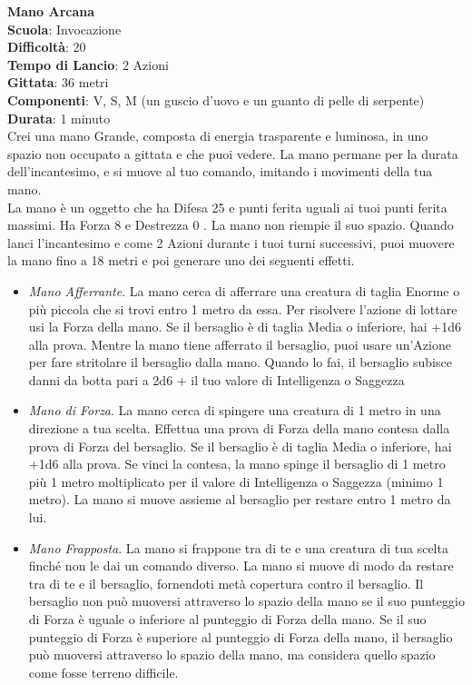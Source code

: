 \begin{multicols}{2}
\medskip\textbf{Mano Arcana}\\
\textbf{Scuola}: Invocazione\\
\textbf{Difficoltà}:  20\\
\textbf{Tempo di Lancio}: 2 Azioni\\
\textbf{Gittata}: 36 metri\\
\textbf{Componenti}: V, S, M (un guscio d’uovo e un guanto di pelle di serpente)\\
\textbf{Durata}: 1 minuto\\
Crei una mano Grande, composta di energia trasparente e luminosa, in uno spazio non occupato a gittata e che puoi vedere. La mano permane per la durata dell'incantesimo, e si muove al tuo comando, imitando i movimenti della tua mano.\\
La mano è un oggetto che ha Difesa 25 e punti ferita uguali  ai tuoi punti ferita massimi. Ha Forza 8 e Destrezza 0 . La mano non riempie il suo spazio.
Quando lanci l'incantesimo e come 2 Azioni durante i tuoi turni successivi, puoi muovere la mano fino a 18 metri e poi generare uno dei seguenti effetti. 
\medskip
\begin{itemize}
\item
\textit{Mano Afferrante}. La mano cerca di afferrare una creatura di taglia Enorme o più piccola che si trovi entro  1 metro da essa. Per risolvere l’azione di lottare usi la Forza della mano. Se il bersaglio è di taglia Media o inferiore, hai +1d6 alla prova. Mentre la mano tiene afferrato il bersaglio, puoi usare un'Azione per fare stritolare il bersaglio dalla mano. Quando lo fai, il bersaglio subisce danni da botta pari a  2d6 + il tuo valore di Intelligenza o Saggezza
\item
\textit{Mano di Forza}. La mano cerca di spingere una creatura di 1 metro in una direzione a tua scelta. Effettua una prova di Forza della mano contesa dalla prova di Forza del bersaglio. Se il bersaglio è di taglia Media o inferiore, hai +1d6 alla prova. Se vinci la contesa, la mano spinge il bersaglio di 1 metro più 1 metro moltiplicato per il valore di Intelligenza o Saggezza (minimo 1 metro). La mano si muove assieme al bersaglio per restare entro 1 metro da lui.\\
\item
\textit{Mano Frapposta}. La mano si frappone tra di te e una creatura di tua scelta finché non le dai un comando  diverso. La mano si muove di modo da restare tra di te e il bersaglio, fornendoti metà copertura contro il  bersaglio. Il bersaglio non può muoversi attraverso lo spazio della mano se il suo punteggio di Forza è uguale o inferiore al punteggio di Forza della mano. Se il suo punteggio di Forza è superiore al punteggio di Forza della mano, il bersaglio può muoversi attraverso lo spazio  della mano, ma considera quello spazio come fosse terreno difficile. \\

\end{itemize}
\end{multicols}
